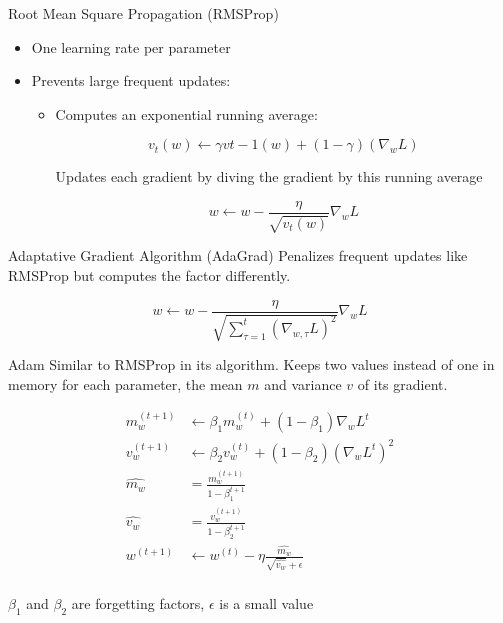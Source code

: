 \begin{frame}{Root Mean Square Propagation (RMSProp)}
  \begin{itemize}
    \item One learning rate per parameter
    \item Prevents large frequent updates:
      \begin{itemize}
        \item Computes an exponential running average:

        \[v_t(w) \leftarrow \gamma v{t-1}(w) + (1 - \gamma)(\nabla_w L)\]

        Updates each gradient by diving the gradient by this running average

        \[w \leftarrow w - \frac{\eta}{\sqrt{v_t(w)}}\nabla_wL\]
      \end{itemize}
  \end{itemize}
\end{frame}

\begin{frame}{Adaptative Gradient Algorithm (AdaGrad)}
  Penalizes frequent updates like RMSProp but computes the factor differently.

  \[
    w \leftarrow w - \frac{\eta}{\sqrt{\sum_{\tau=1}^t(\nabla_{w,\tau} L)^2}}\nabla_{w} L
  \]
\end{frame}

\begin{frame}{Adam}
  Similar to RMSProp in its algorithm. Keeps two values instead of one in memory for each parameter, the mean $m$ and variance $v$ of its gradient.

  \begin{align*}
    m_w^{(t+1)} &\leftarrow \beta_1m_w^{(t)} + (1 - \beta_1)\nabla_wL^{t} \\
    v_w^{(t+1)} &\leftarrow \beta_2v_w^{(t)} + (1 - \beta_2)(\nabla_wL^{t})^2 \\
    \hat{m_w} &= \frac{m_w^{(t+1)}}{1 - \beta_1^{t+1}} \\
    \hat{v_w} &= \frac{v_w^{(t+1)}}{1 - \beta_2^{t+1}} \\
    w^{(t+1)} &\leftarrow w^{(t)} - \eta\frac{\hat{m_w}}{\sqrt{\hat{v_w}} + \epsilon} \\
  \end{align*}

  $\beta_1$ and $\beta_2$ are forgetting factors, $\epsilon$ is a small value
\end{frame}
